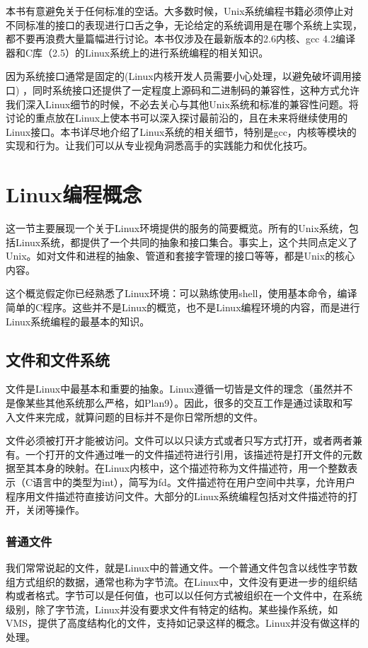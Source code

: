 本书有意避免关于任何标准的空话。大多数时候，Unix系统编程书籍必须停止对不同标准的接口的表现进行口舌之争，无论给定的系统调用是在哪个系统上实现，都不要再浪费大量篇幅进行讨论。本书仅涉及在最新版本的2.6内核、gcc 4.2编译器和C库（2.5）的Linux系统上的进行系统编程的相关知识。

因为系统接口通常是固定的(Linux内核开发人员需要小心处理，以避免破坏调用接口) ，同时系统接口还提供了一定程度上源码和二进制码的兼容性，这种方式允许我们深入Linux细节的时候，不必去关心与其他Unix系统和标准的兼容性问题。将讨论的重点放在Linux上使本书可以深入探讨最前沿的，且在未来将继续使用的Linux接口。本书详尽地介绍了Linux系统的相关细节，特别是gcc，内核等模块的实现和行为。让我们可以从专业视角洞悉高手的实践能力和优化技巧。 


\section{Linux编程概念}
这一节主要展现一个关于Linux环境提供的服务的简要概览。所有的Unix系统，包括Linux系统，都提供了一个共同的抽象和接口集合。事实上，这个共同点定义了Unix。如对文件和进程的抽象、管道和套接字管理的接口等等，都是Unix的核心内容。

这个概览假定你已经熟悉了Linux环境：可以熟练使用shell，使用基本命令，编译简单的C程序。这些并不是Linux的概览，也不是Linux编程环境的内容，而是进行Linux系统编程的最基本的知识。

\subsection{文件和文件系统}

文件是Linux中最基本和重要的抽象。Linux遵循一切皆是文件的理念（虽然并不是像某些其他系统那么严格，如Plan9）。因此，很多的交互工作是通过读取和写入文件来完成，就算问题的目标并不是你日常所想的文件。

文件必须被打开才能被访问。文件可以以只读方式或者只写方式打开，或者两者兼有。一个打开的文件通过唯一的文件描述符进行引用，该描述符是打开文件的元数据至其本身的映射。在Linux内核中，这个描述符称为文件描述符，用一个整数表示（C语言中的类型为int），简写为fd。文件描述符在用户空间中共享，允许用户程序用文件描述符直接访问文件。大部分的Linux系统编程包括对文件描述符的打开，关闭等操作。

\subsubsection{普通文件}

我们常常说起的文件，就是Linux中的普通文件。一个普通文件包含以线性字节数组方式组织的数据，通常也称为字节流。在Linux中，文件没有更进一步的组织结构或者格式。字节可以是任何值，也可以以任何方式被组织在一个文件中，在系统级别，除了字节流，Linux并没有要求文件有特定的结构。某些操作系统，如VMS，提供了高度结构化的文件，支持如记录这样的概念。Linux并没有做这样的处理。

